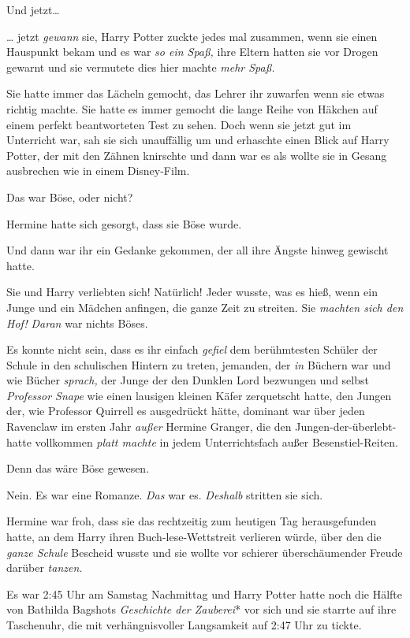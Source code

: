 {Und jetzt…

… jetzt \emph{gewann} sie, Harry Potter zuckte jedes mal zusammen, wenn sie einen Hauspunkt bekam und es war \emph{so ein Spaß,} ihre Eltern hatten sie vor Drogen gewarnt und sie vermutete dies hier machte \emph{mehr Spaß.}

Sie hatte immer das Lächeln gemocht, das Lehrer ihr zuwarfen wenn sie etwas richtig machte. Sie hatte es immer gemocht die lange Reihe von Häkchen auf einem perfekt beantworteten Test zu sehen. Doch wenn sie jetzt gut im Unterricht war, sah sie sich unauffällig um und erhaschte einen Blick auf Harry Potter, der mit den Zähnen knirschte und dann war es als wollte sie in Gesang ausbrechen wie in einem Disney-Film.

Das war Böse, oder nicht?

Hermine hatte sich gesorgt, dass sie Böse wurde.

Und dann war ihr ein Gedanke gekommen, der all ihre Ängste hinweg gewischt hatte.

Sie und Harry verliebten sich! Natürlich! Jeder wusste, was es hieß, wenn ein Junge und ein Mädchen anfingen, die ganze Zeit zu streiten. Sie \emph{machten sich den Hof!} \emph{Daran} war nichts Böses.

Es konnte nicht sein, dass es ihr einfach \emph{gefiel} dem berühmtesten Schüler der Schule in den schulischen Hintern zu treten, jemanden, der \emph{in} Büchern war und wie Bücher \emph{sprach,} der Junge der den Dunklen Lord bezwungen und selbst \emph{Professor Snape} wie einen lausigen kleinen Käfer zerquetscht hatte, den Jungen der, wie Professor Quirrell es ausgedrückt hätte, dominant war über jeden Ravenclaw im ersten Jahr \emph{außer} Hermine Granger, die den Jungen-der-überlebt-hatte vollkommen \emph{platt machte} in jedem Unterrichtsfach außer Besenstiel-Reiten.

Denn das wäre Böse gewesen.

Nein. Es war eine Romanze. \emph{Das} war es. \emph{Deshalb} stritten sie sich.

Hermine war froh, dass sie das rechtzeitig zum heutigen Tag herausgefunden hatte, an dem Harry ihren Buch-lese-Wettstreit verlieren würde, über den die \emph{ganze Schule} Bescheid wusste und sie wollte vor schierer überschäumender Freude darüber \emph{tanzen.}

Es war 2:45 Uhr am Samstag Nachmittag und Harry Potter hatte noch die Hälfte von Bathilda Bagshots \emph{Geschichte der Zauberei}* vor sich und sie starrte auf ihre Taschenuhr, die mit verhängnisvoller Langsamkeit auf 2:47 Uhr zu tickte.

}
